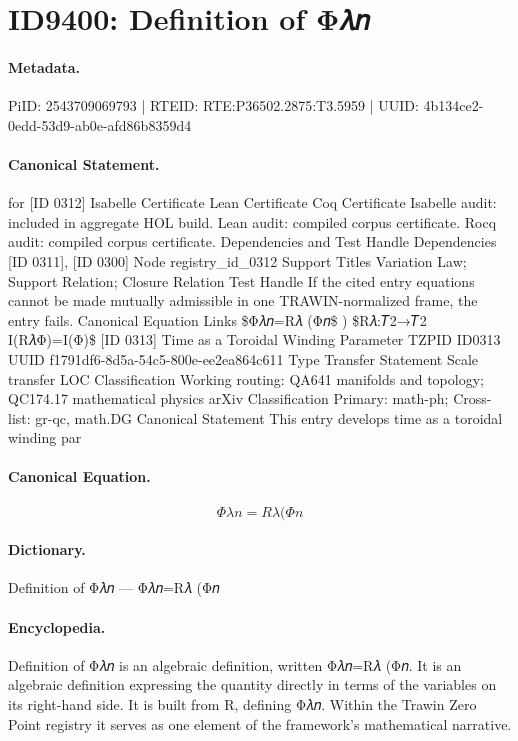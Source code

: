 \section*{ID9400: Definition of Φ𝜆𝑛}
\paragraph{Metadata.}
PiID: 2543709069793 | RTEID: RTE:P36502.2875:T3.5959 | UUID: 4b134ce2-0edd-53d9-ab0e-afd86b8359d4

\paragraph{Canonical Statement.}
for [ID 0312] Isabelle Certificate Lean Certificate Coq Certificate Isabelle audit: included in aggregate HOL build. Lean audit: compiled corpus certificate. Rocq audit: compiled corpus certificate. Dependencies and Test Handle Dependencies [ID 0311], [ID 0300] Node registry\_id\_0312 Support Titles Variation Law; Support Relation; Closure Relation Test Handle If the cited entry equations cannot be made mutually admissible in one TRAWIN-normalized frame, the entry fails. Canonical Equation Links \$Φ𝜆𝑛=R𝜆 (Φ𝑛\$ ) \$R𝜆:𝑇2→𝑇2 I(R𝜆Φ)=I(Φ)\$ [ID 0313] Time as a Toroidal Winding Parameter TZPID ID0313 UUID f1791df6-8d5a-54c5-800e-ee2ea864c611 Type Transfer Statement Scale transfer LOC Classification Working routing: QA641 manifolds and topology; QC174.17 mathematical physics arXiv Classification Primary: math-ph; Cross-list: gr-qc, math.DG Canonical Statement This entry develops time as a toroidal winding par

\paragraph{Canonical Equation.}
\[
Φ𝜆𝑛=R𝜆 (Φ𝑛
\]

\paragraph{Dictionary.}
Definition of Φ𝜆𝑛 — Φ𝜆𝑛=R𝜆 (Φ𝑛

\paragraph{Encyclopedia.}
Definition of Φ𝜆𝑛 is an algebraic definition, written Φ𝜆𝑛=R𝜆 (Φ𝑛. It is an algebraic definition expressing the quantity directly in terms of the variables on its right-hand side. It is built from R, defining Φ𝜆𝑛. Within the Trawin Zero Point registry it serves as one element of the framework's mathematical narrative.
